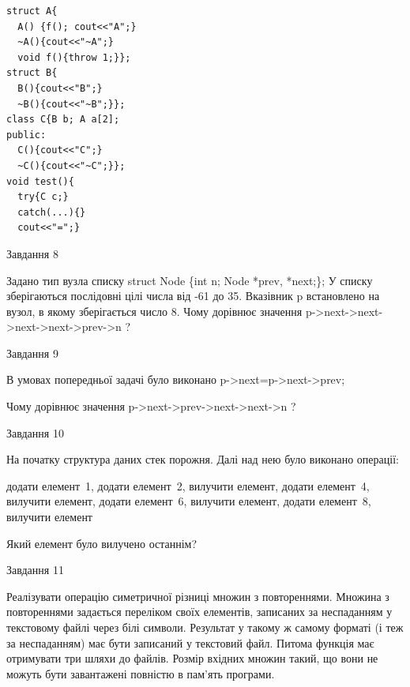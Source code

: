 \documentclass[12pt, ukrainian]{article}
\begin{document}
{{{{{{{{\begin{minipage}[t]{7cm}
\begin{verbatim}
struct A{
  A() {f(); cout<<"A";}
  ~A(){cout<<"~A";} 
  void f(){throw 1;}};
struct B{
  B(){cout<<"B";}
  ~B(){cout<<"~B";}};
class C{B b; A a[2];
public:
  C(){cout<<"C";}
  ~C(){cout<<"~C";}};
void test(){
  try{C c;} 
  catch(...){} 
  cout<<"=";}
\end{verbatim}            


\end{minipage}
               
{\begin{center}Завдання {8}\end{center}}
\vspace{-6mm}
Задано тип вузла списку
struct Node \{int n; Node *prev, *next;\};
У списку зберігаються послідовні цілі числа від -61 до 35. Вказівник p встановлено на вузол, в якому зберігається число 8.
Чому дорівнює значення p->next->next->next->next->prev->n ?\par

               
{\begin{center}Завдання {9}\end{center}}
\vspace{-6mm}
В умовах попередньої задачі було виконано p->next=p->next->prev;

Чому дорівнює значення p->next->prev->next->next->n ?\par

\newpage
               
{\begin{center}Завдання {10}\end{center}}
\vspace{-6mm}
На початку структура даних стек порожня. Далі над нею було виконано операції:

додати елемент~1, додати елемент~2, вилучити елемент, додати елемент~4, вилучити елемент, додати елемент~6, вилучити елемент, додати елемент~8, вилучити елемент

Який елемент було вилучено останнім?\par

               
{\begin{center}Завдання {11}\end{center}}
\vspace{-6mm}

Реалізувати операцію симетричної різниці множин з повтореннями. Множина з повтореннями задається переліком своїх елементів, записаних за неспаданням у текстовому файлі через білі символи. Результат у такому ж самому форматі (і теж за неспаданням) має бути записаний у текстовий файл. Питома функція має отримувати три шляхи до файлів. Розмір вхідних множин такий, що вони не можуть бути завантажені повністю в пам’ять програми.

}}}}}}}}
\end{document}

